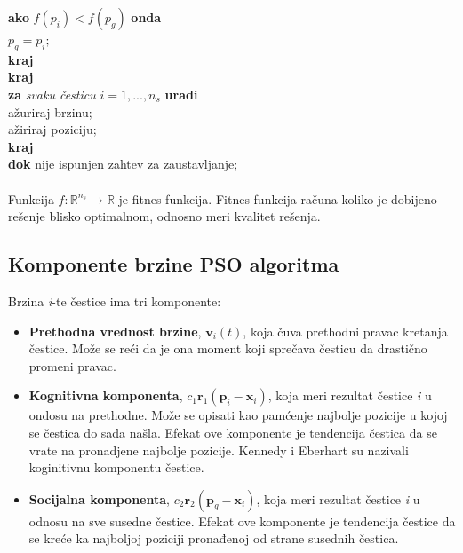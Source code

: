 \documentclass[a4paper]{article}
\begin{document}
\hspace*{10mm}\textbf{ako} $f(p_i) < f(p_g)$ \textbf{onda} \\
\hspace*{15mm} $p_g = p_i;$ \\
\hspace*{10mm} \textbf{kraj} \\
\hspace*{5mm} \textbf{kraj} \\
\hspace*{5mm} \textbf{za} \textit{svaku česticu} $i = 1,...,n_s$ \textbf{uradi}\\
\hspace*{10mm} ažuriraj brzinu; \\
\hspace*{10mm} ažiriraj poziciju; \\
\hspace*{5mm} \textbf{kraj} \\
\textbf{dok} nije ispunjen zahtev za zaustavljanje; \\ \\Funkcija $f:\mathbb{R}^{n_s} \to \mathbb{R}$ je fitnes funkcija. Fitnes funkcija računa koliko je dobijeno rešenje blisko optimalnom, odnosno meri kvalitet rešenja.
\subsection{Komponente brzine PSO algoritma}
Brzina \textit{i}-te čestice ima tri komponente:\\
\begin{itemize}
    \item \textbf{Prethodna vrednost brzine}, $\textbf{v}_i(t)$, koja čuva prethodni pravac kretanja čestice. Može se reći da je ona moment koji sprečava česticu da drastično promeni pravac. 
    \item \textbf{Kognitivna komponenta}, $c_1\textbf{r}_1(\textbf{p}_i - \textbf{x}_i)$, koja meri rezultat čestice \textit{i} u ondosu na prethodne. Može se opisati kao pamćenje najbolje pozicije u kojoj se čestica do sada našla. Efekat ove komponente je tendencija čestica da se vrate na pronadjene najbolje pozicije. Kennedy i Eberhart su nazivali koginitivnu komponentu  čestice.
    \item \textbf{Socijalna komponenta}, $c_2\textbf{r}_2(\textbf{p}_g - \textbf{x}_i)$, koja meri rezultat čestice \textit{i} u odnosu na sve susedne čestice. Efekat ove komponente je tendencija čestice da se kreće ka najboljoj poziciji pronađenoj od strane susednih čestica.
\end{itemize}
\end{document}
